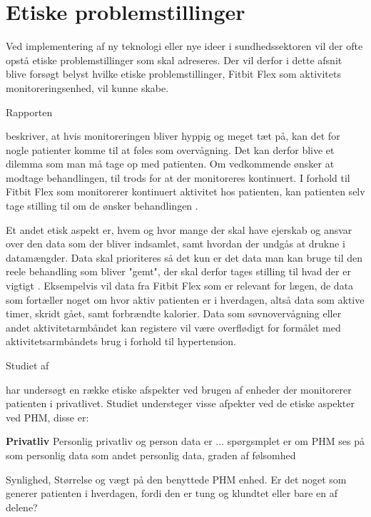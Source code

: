 \section{Etiske problemstillinger}

Ved implementering af ny teknologi eller nye ideer i sundhedssektoren vil der ofte opstå etiske problemstillinger som skal adreseres. Der vil derfor i dette afsnit blive forsøgt belyst hvilke etiske problemstillinger, Fitbit Flex som aktivitets monitoreringsenhed, vil kunne skabe.

Rapporten \author{patienthome2015} beskriver, at hvis monitoreringen bliver hyppig og meget tæt på, kan det for nogle patienter komme til at føles som overvågning. Det kan derfor blive et dilemma som man må tage op med patienten. Om vedkommende ønsker at modtage behandlingen, til trods for at der monitoreres kontinuert. I forhold til Fitbit Flex som monitorerer kontinuert aktivitet hos patienten, kan patienten selv tage stilling til om de ønsker behandlingen \citep{patienthome2015}.

Et andet etisk aspekt er, hvem og hvor mange der skal have ejerskab og ansvar over den data som der bliver indsamlet, samt hvordan der undgås at drukne i datamængder. Data skal prioriteres så det kun er det data man kan bruge til den reele behandling som bliver "gemt", der skal derfor tages stilling til hvad der er vigtigt \citep{patienthome2015}. Eksempelvis vil data fra Fitbit Flex som er relevant for lægen, de data som fortæller noget om hvor aktiv patienten er i hverdagen, altså data som aktive timer, skridt gået, samt forbrændte kalorier. Data som søvnovervågning eller andet aktivitetarmbåndet kan registere vil være overflødigt for formålet med aktivitetsarmbåndets brug i forhold til hypertension.

Studiet af \author{Mittelstand2011} har undersøgt en række etiske afspekter ved brugen af enheder der monitorerer patienten i privatlivet. Studiet understeger visse afpekter ved de etiske aspekter ved PHM, disse er:

\textbf{Privatliv}
Personlig privatliv og person data er ... spørgsmplet er om PHM ses på som personlig data som andet personlig data, graden af følsomhed

Synlighed, 
Størrelse og vægt på den benyttede PHM enhed. Er det noget som generer patienten i hverdagen, fordi den er tung og klundtet eller bare en af delene? 

